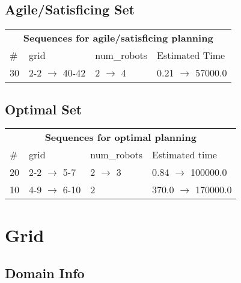 \documentclass{article}
\begin{document}
                         \subsection*{Agile/Satisficing Set}

                        \begin{center}
                        \begin{tabular}{l|l|l|l}
                        \multicolumn{4}{c}{\bf \large Sequences for agile/satisficing planning}\\
                        \# & grid & num\_robots & Estimated Time\\\midrule
                        30&2-2 $\rightarrow$ 40-42&2 $\rightarrow$ 4&0.21 $\rightarrow$ 57000.0
                        \end{tabular}
                        \end{center}
                    
                            \subsection*{Optimal Set}

                            \begin{center}
                            \begin{tabular}{l|l|l|l}
                            \multicolumn{4}{c}{\bf \large Sequences for optimal planning}\\
                            \# & grid & num\_robots & Estimated time\\\midrule
                            20&2-2 $\rightarrow$ 5-7&2 $\rightarrow$ 3&0.84 $\rightarrow$ 100000.0\\
10&4-9 $\rightarrow$ 6-10&2&370.0 $\rightarrow$ 170000.0
                            \end{tabular}
                            \end{center}
                    \newpage \section{Grid}
                    \subsection*{Domain Info}
\end{document}
